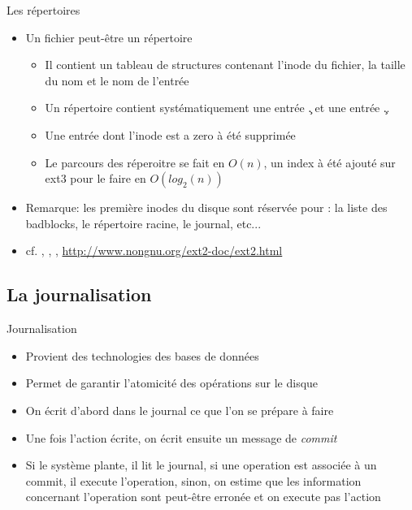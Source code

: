 \begin{frame}[fragile=singleslide]{Les répertoires}
  \begin{itemize}
  \item Un fichier peut-être un répertoire
    \begin{itemize}
    \item Il  contient un tableau  de structures contenant  l'inode du
      fichier, la taille du nom et le nom de l'entrée
    \item Un répertoire contient  systématiquement une entrée \c{.} et
      une entrée \c{..}
    \item Une entrée dont l'inode est a zero à été supprimée
    \item Le parcours  des réperoitre se fait en $O(n)$,  un index à été
      ajouté sur ext3 pour le faire en $O(log_2(n))$
    \end{itemize}
  \item Remarque: les  première inodes du disque sont  réservée pour :
    la liste des badblocks, le répertoire racine, le journal, etc...
  \item  cf.   ,  ,  ,
    \url{http://www.nongnu.org/ext2-doc/ext2.html}
  \end{itemize}
\end{frame}

\subsection{La journalisation}

\begin{frame}[fragile=singleslide]{Journalisation}
  \begin{itemize}
  \item Provient des technologies des bases de données
  \item Permet de garantir l'atomicité des opérations sur le disque
  \item On  écrit d'abord  dans le  journal ce que  l'on se  prépare à
    faire
  \item  Une fois  l'action écrite,  on  écrit ensuite  un message  de
    \emph{commit}
  \item Si le système plante, il  lit le journal, si une operation est
    associée à un commit, il execute l'operation, sinon, on estime que
    les information  concernant l'operation sont  peut-être erronée et
    on execute pas l'action
  \end{itemize}
\end{frame}


